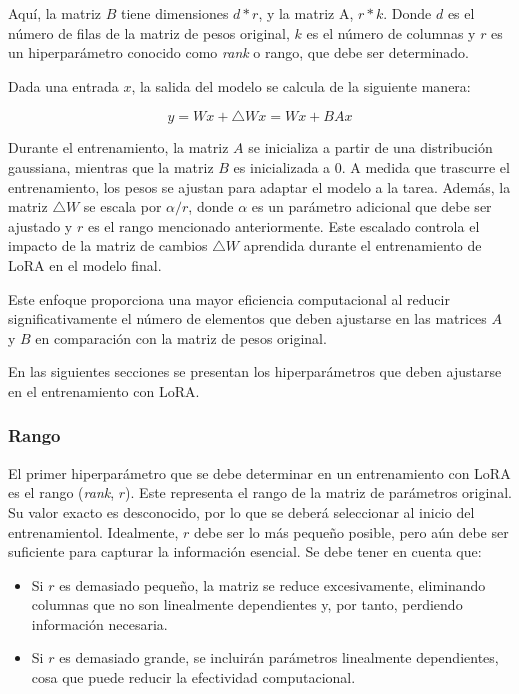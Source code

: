 \documentclass[11pt,spanish,listoffigures,listoftables]{tfgetsinf}
\begin{document}
Aquí, la matriz $B$ tiene dimensiones $d * r$, y la matriz A, $r * k$. Donde $d$ es el número de filas de la matriz de pesos original, $k$ es el número de columnas y $r$ es un hiperparámetro conocido como \textit{rank} o rango, que debe ser determinado.

Dada una entrada $x$, la salida del modelo se calcula de la siguiente manera:

\begin{equation}
y = Wx + \bigtriangleup Wx = Wx + BAx
\end{equation}

Durante el entrenamiento, la matriz $A$ se inicializa a partir de una distribución gaussiana, mientras que la matriz $B$ es inicializada a 0. A medida que trascurre el entrenamiento, los pesos se ajustan para adaptar el modelo a la tarea. Además, la matriz $\bigtriangleup W$ se escala por $\alpha / r$, donde $\alpha$ es un parámetro adicional que debe ser ajustado y $r$ es el rango mencionado anteriormente. Este escalado controla el impacto de la matriz de cambios $\bigtriangleup W$ aprendida durante el entrenamiento de LoRA en el modelo final.

Este enfoque proporciona una mayor eficiencia computacional al reducir significativamente el número de elementos que deben ajustarse en las matrices $A$ y $B$ en comparación con la matriz de pesos original. 

En las siguientes secciones se presentan los hiperparámetros que deben ajustarse en el entrenamiento con LoRA.

\subsubsection{Rango}

El primer hiperparámetro que se debe determinar en un entrenamiento con LoRA es el rango (\textit{rank}, $r$). Este representa el rango de la matriz de parámetros original. Su valor exacto es desconocido, por lo que se deberá seleccionar al inicio del entrenamientol. Idealmente, $r$ debe ser lo más pequeño posible, pero aún debe ser suficiente para capturar la información esencial. Se debe tener en cuenta que:

\begin{itemize}
	\item Si $r$ es demasiado pequeño, la matriz se reduce excesivamente, eliminando columnas que no son linealmente dependientes y, por tanto, perdiendo información necesaria.
	\item Si $r$ es demasiado grande, se incluirán parámetros linealmente dependientes, cosa que puede reducir la efectividad computacional.
\end{itemize}
\end{document}
